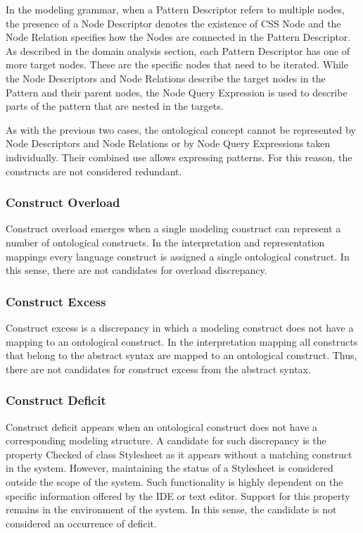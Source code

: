 In the modeling grammar, when a Pattern Descriptor refers to multiple nodes,
the presence of a Node Descriptor denotes the existence of CSS Node and the
Node Relation specifies how the Nodes are connected in the Pattern Descriptor.
As described in the domain analysis section, each Pattern Descriptor has one
of more target nodes. These are the specific nodes that need to be iterated. While
the Node Descriptors and Node Relations describe the target nodes in the
Pattern and their parent nodes, the Node Query Expression is used to describe
parts of the pattern that are nested in the targets.

As with the previous two cases, the ontological concept cannot be represented
by Node Descriptors and Node Relations or by Node Query Expressions taken
individually. Their combined use allows expressing patterns. For this reason,
the constructs are not considered redundant.


\subsubsection{Construct Overload}

Construct overload emerges when a single modeling construct can represent a
number of ontological constructs. In the interpretation and representation
mappings every language construct is assigned a single ontological construct.
In this sense, there are not candidates for overload discrepancy.

\subsubsection{Construct Excess}

Construct excess is a discrepancy in which a modeling construct does not have
a mapping to an ontological construct. In the interpretation mapping all
constructs that belong to the abstract syntax are mapped to an ontological
construct. Thus, there are not candidates for construct excess from the
abstract syntax.

\subsubsection{Construct Deficit}

Construct deficit appears when an ontological construct does not have a
corresponding modeling structure. A candidate for such discrepancy is the
property Checked of class Stylesheet as it appears without a matching
construct in the system. However, maintaining the status of a Stylesheet is
considered outside the scope of the system. Such functionality is highly
dependent on the specific information offered by the IDE or text editor.
Support for this property remains in the environment of the system. In this
sense, the candidate is not considered an occurrence of deficit.


